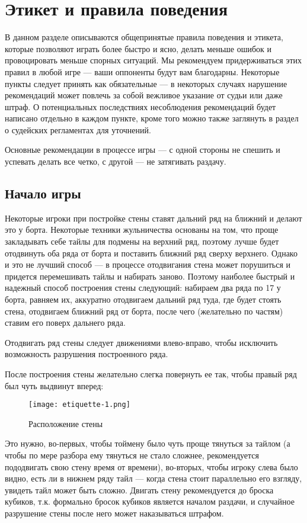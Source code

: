 \section{Этикет и правила поведения}

В данном разделе описываются общепринятые правила поведения и этикета, которые позволяют играть более быстро и ясно, делать меньше ошибок и провоцировать меньше спорных ситуаций. Мы рекомендуем придерживаться этих правил в любой игре --- ваши оппоненты будут вам благодарны. Некоторые пункты следует принять как обязательные --- в некоторых случаях нарушение рекомендаций может повлечь за собой вежливое указание от судьи или даже штраф. О потенциальных последствиях несоблюдения рекомендаций будет написано отдельно в каждом пункте, кроме того можно также заглянуть в раздел о судейских регламентах для уточнений.

Основные рекомендации в процессе игры --- с одной стороны не спешить и успевать делать все четко, с другой --- не затягивать раздачу. 

\subsection {Начало игры}

Некоторые игроки при постройке стены ставят дальний ряд на ближний и делают это у борта. Некоторые техники жульничества основаны на том, что проще закладывать себе тайлы для подмены на верхний ряд, поэтому лучше будет отодвинуть оба ряда от борта и поставить ближний ряд сверху верхнего. Однако и это не лучший способ --- в процессе отодвигания стена может порушиться и придется перемешивать тайлы и набирать заново. Поэтому наиболее быстрый и надежный способ построения стены следующий: набираем два ряда по 17 у борта, равняем их, аккуратно отодвигаем дальний ряд туда, где будет стоять стена, отодвигаем ближний ряд от борта, после чего (желательно по частям) ставим его поверх дальнего ряда. 

Отодвигать ряд стены следует движениями влево-вправо, чтобы исключить возможность разрушения построенного ряда.

После построения стены желательно слегка повернуть ее так, чтобы правый ряд был чуть выдвинут вперед:

\begin{figure}[H]
	\centering
	\texttt{[image: etiquette-1.png]}
	\caption{Расположение стены}
\end{figure}

Это нужно, во-первых, чтобы тоймену было чуть проще тянуться за тайлом (а чтобы по мере разбора ему тянуться не стало сложнее, рекомендуется пододвигать свою стену время от времени), во-вторых, чтобы игроку слева было видно, есть ли в нижнем ряду тайл --- когда стена стоит параллельно его взгляду, увидеть тайл может быть сложно. Двигать стену рекомендуется до броска кубиков, т.к. формально бросок кубиков является началом раздачи, и случайное разрушение стены после него может наказываться штрафом. 

